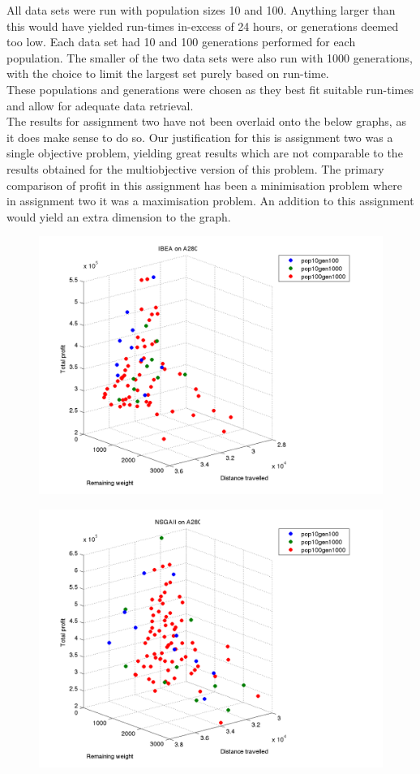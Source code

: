 \documentclass[a4paper,12pt]{article}
\begin{document}
All data sets were run with population sizes 10 and 100. Anything larger than this would have yielded run-times in-excess of 24 hours, or generations deemed too low. Each data set had 10 and 100 generations performed for each population. The smaller of the two data sets were also run with 1000 generations, with the choice to limit the largest set purely based on run-time.\\

These populations and generations were chosen as they best fit suitable run-times and allow for adequate data retrieval.\\

The results for assignment two have not been overlaid onto the below graphs, as it does make sense to do so. Our justification for this is assignment two was a single objective problem, yielding great results which are not comparable to the results obtained for the multiobjective version of this problem. The primary comparison of profit in this assignment has been a minimisation problem where in assignment two it was a maximisation problem. An addition to this assignment would yield an extra dimension to the graph. \\

\begin{figure}[h]
  \centering
  \includegraphics[width=.8\linewidth]{q5graphs/a280_ibea.png}
  \label{fig:a280279010}
\end{figure}

\begin{figure}[h]
  \centering
  \includegraphics[width=.8\linewidth]{q5graphs/a280_nsga.png}
  \label{fig:a280279010}
\end{figure}
\end{document}
